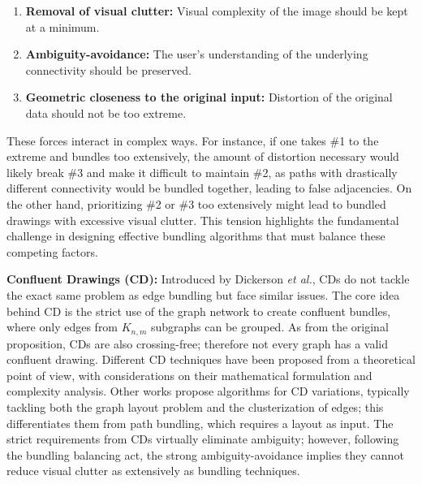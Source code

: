 \begin{enumerate}
\item \textbf{Removal of visual clutter:} Visual complexity of the image should be kept at a minimum.
\item \textbf{Ambiguity-avoidance:} The user's understanding of the underlying connectivity should be preserved.
\item \textbf{Geometric closeness to the original input:} Distortion of the original data should not be too extreme.
\end{enumerate}

These forces interact in complex ways. For instance, if one takes \#1 to the extreme and bundles too extensively, the amount of distortion necessary would likely break \#3 and make it difficult to maintain \#2, as paths with drastically different connectivity would be bundled together, leading to false adjacencies. On the other hand, prioritizing \#2 or \#3 too extensively might lead to bundled drawings with excessive visual clutter. This tension highlights the fundamental challenge in designing effective bundling algorithms that must balance these competing factors.

\textbf{Confluent Drawings (CD):} Introduced by Dickerson \textit{et al.}\cite{dickerson:2002}, CDs do not tackle the exact same problem as edge bundling but face similar issues. The core idea behind CD is the strict use of the graph network to create confluent bundles, where only edges from $K_{n,m}$ subgraphs can be grouped. As from the original proposition, CDs are also crossing-free; therefore not every graph has a valid confluent drawing. Different CD techniques have been proposed from a theoretical point of view\cite{eppstein:2006,hui:2007,eppstein:2013}, with considerations on their mathematical formulation and complexity analysis. Other works propose algorithms for CD variations, typically tackling both the graph layout problem and the clusterization of edges\cite{dickerson:2002,hirsch:2007,eppstein:2007,honciuc:2009}; this differentiates them from path bundling, which requires a layout as input. The strict requirements from CDs virtually eliminate ambiguity; however, following the bundling balancing act, the strong ambiguity-avoidance implies they cannot reduce visual clutter as extensively as bundling techniques.

